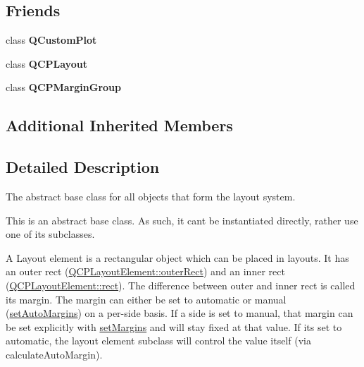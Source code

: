 \subsection*{Friends}
\begin{DoxyCompactItemize}
\item 
class {\bfseries Q\+Custom\+Plot}\hypertarget{classQCPLayoutElement_a1cdf9df76adcfae45261690aa0ca2198}{}\label{classQCPLayoutElement_a1cdf9df76adcfae45261690aa0ca2198}

\item 
class {\bfseries Q\+C\+P\+Layout}\hypertarget{classQCPLayoutElement_a588aac0a0d721f6c5f10126d8596a20f}{}\label{classQCPLayoutElement_a588aac0a0d721f6c5f10126d8596a20f}

\item 
class {\bfseries Q\+C\+P\+Margin\+Group}\hypertarget{classQCPLayoutElement_ad077a686e85ab6fa03dcb2fd37fc499a}{}\label{classQCPLayoutElement_ad077a686e85ab6fa03dcb2fd37fc499a}

\end{DoxyCompactItemize}
\subsection*{Additional Inherited Members}


\subsection{Detailed Description}
The abstract base class for all objects that form the layout system. 

This is an abstract base class. As such, it can\textquotesingle{}t be instantiated directly, rather use one of its subclasses.

A Layout element is a rectangular object which can be placed in layouts. It has an outer rect (\hyperlink{classQCPLayoutElement_a60bbddee2d1230c2414bd776f44d17b8}{Q\+C\+P\+Layout\+Element\+::outer\+Rect}) and an inner rect (\hyperlink{classQCPLayoutElement_affdfea003469aac3d0fac5f4e06171bc}{Q\+C\+P\+Layout\+Element\+::rect}). The difference between outer and inner rect is called its margin. The margin can either be set to automatic or manual (\hyperlink{classQCPLayoutElement_accfda49994e3e6d51ed14504abf9d27d}{set\+Auto\+Margins}) on a per-\/side basis. If a side is set to manual, that margin can be set explicitly with \hyperlink{classQCPLayoutElement_a8f450b1f3f992ad576fce2c63d8b79cf}{set\+Margins} and will stay fixed at that value. If it\textquotesingle{}s set to automatic, the layout element subclass will control the value itself (via calculate\+Auto\+Margin).

